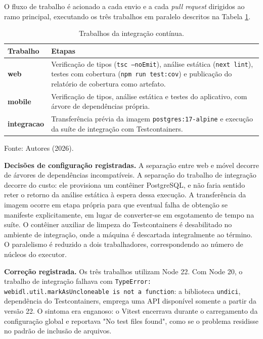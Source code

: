 \documentclass[12pt,a4paper]{article}
\begin{document}
O fluxo de trabalho  é acionado a cada envio e a cada \textit{pull request} dirigidos ao ramo principal, executando os três trabalhos em paralelo descritos na Tabela \ref{tab:ci}.

\begin{table}[H]
\centering
\caption{Trabalhos da integração contínua.}
\label{tab:ci}
\renewcommand{\arraystretch}{1.4}
\begin{tabularx}{\textwidth}{@{}>{\bfseries\RaggedRight}p{2.6cm}>{\RaggedRight\arraybackslash}X@{}}
\toprule
\normalfont\textbf{Trabalho} & \textbf{Etapas} \\
\midrule
web & Verificação de tipos (\texttt{tsc --noEmit}), análise estática (\texttt{next lint}), testes com cobertura (\texttt{npm run test:cov}) e publicação do relatório de cobertura como artefato. \\
mobile & Verificação de tipos, análise estática e testes do aplicativo, com árvore de dependências própria. \\
integracao & Transferência prévia da imagem \texttt{postgres:17-alpine} e execução da suíte de integração com Testcontainers. \\
\bottomrule
\end{tabularx}
\vspace{0.3cm}

\noindent\footnotesize Fonte: Autores (2026).
\end{table}

\textbf{Decisões de configuração registradas.} A separação entre web e móvel decorre de árvores de dependências incompatíveis. A separação do trabalho de integração decorre do custo: ele provisiona um contêiner PostgreSQL, e não faria sentido reter o retorno da análise estática à espera dessa execução. A transferência da imagem ocorre em etapa própria para que eventual falha de obtenção se manifeste explicitamente, em lugar de converter-se em esgotamento de tempo na suíte. O contêiner auxiliar de limpeza do Testcontainers é desabilitado no ambiente de integração, onde a máquina é descartada integralmente ao término. O paralelismo é reduzido a dois trabalhadores, correspondendo ao número de núcleos do executor.

\textbf{Correção registrada.} Os três trabalhos utilizam Node 22. Com Node 20, o trabalho de integração falhava com \texttt{TypeError: webidl.util.markAsUncloneable is not a function}: a biblioteca \texttt{undici}, dependência do Testcontainers, emprega uma API disponível somente a partir da versão 22. O sintoma era enganoso: o Vitest encerrava durante o carregamento da configuração global e reportava "No test files found", como se o problema residisse no padrão de inclusão de arquivos.
\end{document}
